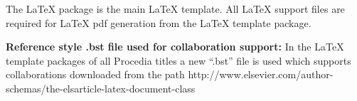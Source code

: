 \documentclass[5p,times,procedia]{elsarticle}
\begin{document}
The LaTeX package is the main LaTeX template. All LaTeX support files are required for LaTeX pdf generation from the LaTeX template package.

{\bf Reference style .bst file used for collaboration support:} In the LaTeX template packages of all Procedia titles a new ``.bst'' file is used which supports collaborations downloaded from the path http://www.elsevier.com/author-schemas/the-elsarticle-latex-document-class
\end{document}
